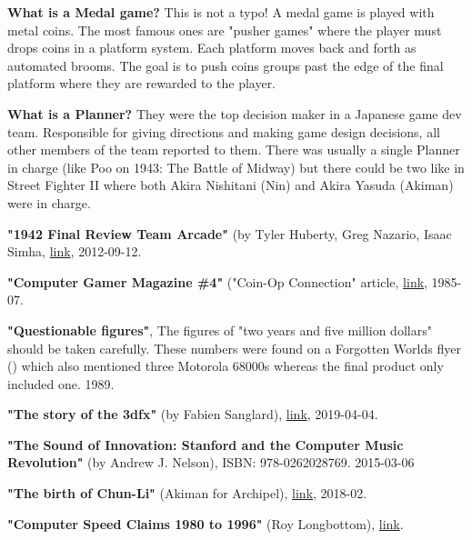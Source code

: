 \renewcommand{\bibname}{Notes \&\ References}
\begin{thebibliography}{999}


\textbf{What is a Medal game?}
This is not a typo! A medal game is played with metal coins. The most famous ones are "pusher games" where the player must drops coins in a platform system. Each platform moves back and forth as automated brooms. The goal is to push coins groups past the edge of the final platform where they are rewarded to the player.    

\textbf{What is a Planner?}
They were the top decision maker in a Japanese game dev team. Responsible for giving directions and making game design decisions, all other members of the team reported to them. There was usually a single Planner in charge (like Poo on 1943: The Battle of Midway) but there could be two like in Street Fighter II where both Akira Nishitani (Nin) and Akira Yasuda (Akiman) were in charge. 

  \textbf{ "1942 Final Review Team Arcade"} (by Tyler Huberty, Greg Nazario, Isaac Simha,
  \href{https://course.ece.cmu.edu/~ece545/F16/reports/F12_Arcade1942.pdf}{link},
  2012-09-12.


  \textbf{ "Computer Gamer Magazine \#4"} ("Coin-Op Connection" article,
  \href{https://www.youtube.com/watch?v=RxIXilYv0kM}{link},
  1985-07.

  \textbf{"Questionable figures"},
  The figures of "two years and five million dollars" should be taken carefully. These numbers were found on a Forgotten Worlds flyer (\pageref{fw_flyer}) which also mentioned three Motorola 68000s whereas the final product only included one. 
  1989.

  \textbf{ "The story of the 3dfx"} (by Fabien Sanglard),
  \href{https://fabiensanglard.net/3dfx_sst1/index.html}{link},
  2019-04-04.

  \textbf{ "The Sound of Innovation: Stanford and the Computer Music Revolution"} (by Andrew J. Nelson),
  ISBN: 978-0262028769.
  2015-03-06

  \textbf{ "The birth of Chun-Li"} (Akiman for Archipel),
  \href{https://www.youtube.com/watch?v=RxIXilYv0kM}{link},
  2018-02.

  \textbf{ "Computer Speed Claims 1980 to 1996"} (Roy Longbottom),
  \href{http://www.roylongbottom.org.uk/mips.htm}{link}.


\end{thebibliography}
